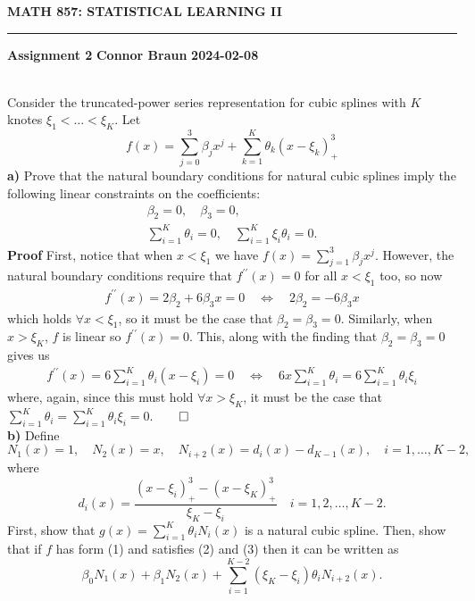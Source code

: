 \documentclass[10pt]{article}
\newcommand{\1}[1]{\mathbbm{1}_{#1}}
\begin{document}
    \begin{center}
        {\bf\large{MATH 857: STATISTICAL LEARNING II}}
        \smallskip
        \hrule
        \smallskip
        {\bf Assignment 2} \hfill {\bf Connor Braun} \hfill {\bf 2024-02-08}
    \end{center}
    \\[5pt]
    Consider the truncated-power series representation for cubic splines with $K$ knotes $\xi_1<\dots<\xi_K$. Let
    \[f(x)=\sum_{j=0}^3\beta_jx^j+\sum_{k=1}^K\theta_k(x-\xi_k)^3_+\tag{1}\]
    {\bf a)}\hspace{5pt} Prove that the natural boundary conditions for natural cubic splines imply the following linear constraints on the coefficients:
    \begin{align*}
        \beta_2=0,\quad\beta_3=0,\tag{2}\\
        \sum_{i=1}^K\theta_i=0,\quad\sum_{i=1}^K\xi_i\theta_i=0\tag{3}.
    \end{align*}
    {\bf Proof}\hspace{5pt} First, notice that when $x<\xi_1$ we have $f(x)=\sum_{j=1}^3\beta_jx^j$. However, the natural boundary conditions require that $f^{\prime\prime}(x)=0$ for all $x<\xi_1$ too, so now
    \begin{align*}
        f^{\prime\prime}(x)=2\beta_2+6\beta_3x=0\quad\Leftrightarrow\quad 2\beta_2=-6\beta_3x
    \end{align*}
    which holds $\forall x<\xi_1$, so it must be the case that $\beta_2=\beta_3=0$. Similarly, when $x>\xi_K$, $f$ is linear so $f^{\prime\prime}(x)=0$. This, along with the finding that $\beta_2=\beta_3=0$ gives us
    \begin{align*}
        f^{\prime\prime}(x)=6\sum_{i=1}^K\theta_i(x-\xi_i)=0\quad\Leftrightarrow\quad 6x\sum_{i=1}^K\theta_i=6\sum_{i=1}^K\theta_i\xi_i
    \end{align*}
    where, again, since this must hold $\forall x>\xi_K$, it must be the case that $\sum_{i=1}^K\theta_i=\sum_{i=1}^K\theta_i\xi_i=0$.\hfill{$\qed$}\\[5pt]
    {\bf b)}\hspace{5pt} Define 
    \[N_1(x)=1,\quad N_2(x)=x,\quad N_{i+2}(x)=d_i(x)-d_{K-1}(x),\quad i=1,\dots,K-2,\]
    where 
    \[d_i(x)=\frac{(x-\xi_i)^3_+-(x-\xi_K)^3_+}{\xi_K-\xi_i}\quad i=1,2,\dots, K-2.\]
    First, show that $g(x)=\sum_{i=1}^K\theta_iN_i(x)$ is a natural cubic spline. Then, show that if $f$ has form (1) and satisfies (2) and (3) then it can be written as
    \[\beta_0N_1(x)+\beta_1N_2(x)+\sum_{i=1}^{K-2}(\xi_K-\xi_i)\theta_iN_{i+2}(x).\tag{4}\]
\end{document}
